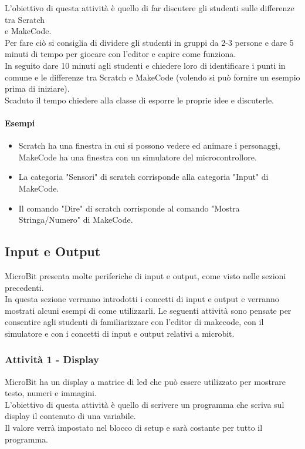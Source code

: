 \documentclass[../../docenti.tex]{subfiles}
\begin{document}
L'obiettivo di questa attività è quello di far discutere gli studenti sulle differenze tra Scratch\\ e MakeCode.\\
Per fare ciò si consiglia di dividere gli studenti in gruppi da 2-3 persone e dare 5 minuti di tempo per giocare con l'editor e capire come funziona.\\
In seguito dare 10 minuti agli studenti e chiedere loro di identificare i punti in comune e le differenze tra Scratch e MakeCode (volendo si può fornire un esempio prima di iniziare).\\
Scaduto il tempo chiedere alla classe di esporre le proprie idee e discuterle.

\paragraph{Esempi}
\begin{itemize}
	\item Scratch ha una finestra in cui si possono vedere ed animare i personaggi, MakeCode ha una finestra con un simulatore del microcontrollore.
	\item La categoria "Sensori" di scratch corrisponde alla categoria "Input" di MakeCode.
	\item Il comando "Dire" di scratch corrisponde al comando "Mostra Stringa/Numero" di MakeCode.
\end{itemize}

\subsection{Input e Output}
MicroBit presenta molte periferiche di input e output, come visto nelle sezioni precedenti.\\
In questa sezione verranno introdotti i concetti di input e output e verranno mostrati alcuni esempi di come utilizzarli.
Le seguenti attività sono pensate per consentire agli studenti di familiarizzare con l'editor di makecode, con il simulatore e con i concetti di input e output relativi a microbit.

\subsubsection{Attività 1 - Display}
MicroBit ha un display a matrice di led che può essere utilizzato per mostrare testo, numeri e immagini.\\
L'obiettivo di questa attività è quello di scrivere un programma che scriva sul display il contenuto di una variabile.\\
Il valore verrà impostato nel blocco di setup e sarà costante per tutto il programma.
\end{document}
